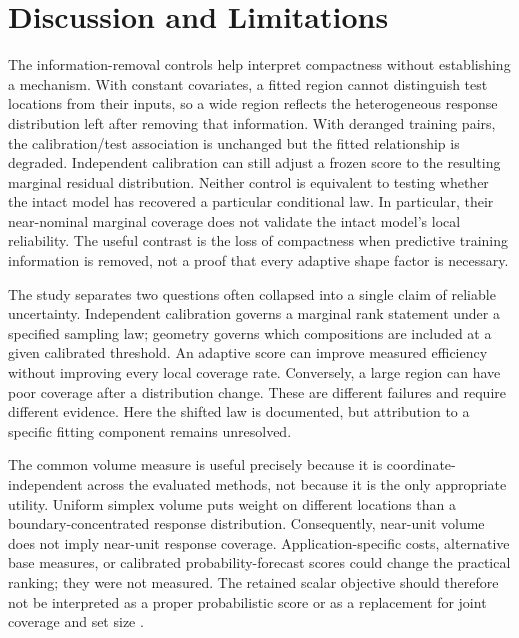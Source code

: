 \documentclass{article}
\begin{document}
\section{Discussion and Limitations}
The information-removal controls help interpret compactness without establishing a mechanism. With constant covariates, a fitted region cannot distinguish test locations from their inputs, so a wide region reflects the heterogeneous response distribution left after removing that information. With deranged training pairs, the calibration/test association is unchanged but the fitted relationship is degraded. Independent calibration can still adjust a frozen score to the resulting marginal residual distribution. Neither control is equivalent to testing whether the intact model has recovered a particular conditional law. In particular, their near-nominal marginal coverage does not validate the intact model's local reliability. The useful contrast is the loss of compactness when predictive training information is removed, not a proof that every adaptive shape factor is necessary.

The study separates two questions often collapsed into a single claim of reliable uncertainty. Independent calibration governs a marginal rank statement under a specified sampling law; geometry governs which compositions are included at a given calibrated threshold. An adaptive score can improve measured efficiency without improving every local coverage rate. Conversely, a large region can have poor coverage after a distribution change. These are different failures and require different evidence. Here the shifted law is documented, but attribution to a specific fitting component remains unresolved.

The common volume measure is useful precisely because it is coordinate-independent across the evaluated methods, not because it is the only appropriate utility. Uniform simplex volume puts weight on different locations than a boundary-concentrated response distribution. Consequently, near-unit volume does not imply near-unit response coverage. Application-specific costs, alternative base measures, or calibrated probability-forecast scores could change the practical ranking; they were not measured. The retained scalar objective should therefore not be interpreted as a proper probabilistic score or as a replacement for joint coverage and set size \citep{Gneiting2007}.
\end{document}
